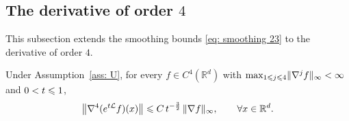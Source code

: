 \subsection{The derivative of order $4$}
\label{sec: fourth}

This subsection extends the smoothing bounds \eqref{eq: smoothing 23} to the derivative of order $4$.

\begin{lemma}
\label{lem: fourth from lipschitz}
    Under Assumption~\ref{ass: U}, for every $f \in C^4(\mathbb R^d)$ with $\max_{1 \leqslant j \leqslant 4} \lVert \nabla^j f \rVert_\infty < \infty$ and $0 < t \leqslant 1$,
    \begin{equation}
        \bigl\| \nabla^4 (e^{t\mathcal L} f)(x) \bigr\| \leqslant C\, t^{-\frac32}\, \lVert \nabla f \rVert_\infty , \qquad \forall x \in \mathbb R^d .
        \label{eq: fourth from lipschitz}
    \end{equation}
\end{lemma}


